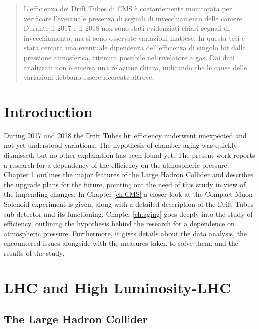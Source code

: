 \documentclass[12pt,twoside,a4paper]{report}
\numberwithin{equation}{section}
\begin{document}
\hypersetup{pageanchor=false}

\newpage\null\thispagestyle{empty}\newpage
\begin{abstract}
L'efficienza dei Drift Tubes di CMS è costantemente monitorata per verificare l'eventuale presenza di segnali di invecchiamento delle camere.
Durante il 2017 e il 2018 non sono stati evidenziati chiari segnali di invecchiamento, ma si sono osservate variazioni inattese.
In questa tesi è stata cercata una eventuale dipendenza dell'efficienza di singolo hit dalla pressione atmosferica, ritenuta possibile nel rivelatore a gas.
Dai dati analizzati non è emersa una relazione chiara, indicando che le cause delle variazioni debbano essere ricercate altrove.
\end{abstract}
\newpage\null\thispagestyle{empty}\newpage
\tableofcontents

\newpage\null\thispagestyle{empty}\newpage
{}
\chapter*{Introduction}
During 2017 and 2018 the Drift Tubes hit efficiency underwent unexpected and not yet understood variations. The hypothesis of chamber aging was quickly dismissed, but no other explanation has been found yet.
The present work reports a research for a dependency of the efficiency on the atmospheric pressure.
Chapter \ref{ch:LHC} outlines the major features of the Large Hadron Collider and describes the upgrade plans for the future, pointing out the need of this study in view of the impending changes.
In Chapter \ref{ch:CMS} a closer look at the Compact Muon Solenoid experiment is given, along with a detailed description of the Drift Tubes sub-detector and its functioning.
Chapter \ref{ch:aging} goes deeply into the study of efficiency, outlining the hypothesis behind the research for a dependence on atmospheric pressure. Furthermore, it gives details about the data analysis, the encountered issues alongside with the measures taken to solve them, and the results of the study.


\newpage\null\thispagestyle{empty}\newpage
\chapter{LHC and High Luminosity-LHC}
\label{ch:LHC}
\section{The Large Hadron Collider}
\end{document}
